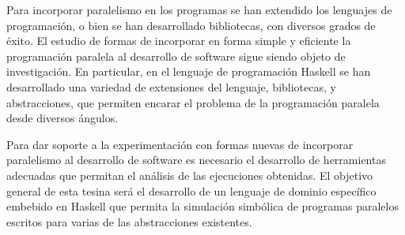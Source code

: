 Para incorporar paralelismo en los programas se han extendido los
lenguajes de programaci\'on, o bien se han desarrollado bibliotecas,
con diversos grados de \'exito.  El estudio de formas de incorporar
en forma simple y eficiente la programaci\'on paralela al desarrollo
de software sigue siendo objeto de investigaci\'on.  En particular, en
el lenguaje de programaci\'on Haskell se han desarrollado una variedad
de extensiones del lenguaje, bibliotecas, y abstracciones, que permiten
encarar el problema de la programaci\'on paralela desde diversos
\'angulos.

Para dar soporte a la experimentaci\'on con formas nuevas de
incorporar paralelismo al desarrollo de software es necesario el
desarrollo de herramientas adecuadas que permitan el an\'alisis de las
ejecuciones obtenidas.
El objetivo general de esta tesina ser\'a el desarrollo de un lenguaje
de dominio espec\'ifico embebido en Haskell que permita la
simulaci\'on simb\'olica de programas paralelos escritos para varias
de las abstracciones existentes.
